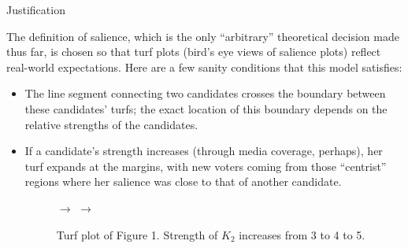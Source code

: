 \documentclass{article}
\begin{document}
\begin{section}{Justification}

The definition of salience, which is the only ``arbitrary'' theoretical decision made thus far, is chosen so that turf plots (bird's eye views of salience plots) reflect real-world expectations. Here are a few sanity conditions that this model satisfies:
\begin{itemize}
\item The line segment connecting two candidates crosses the boundary between these candidates' turfs; the exact location of this boundary depends on the relative strengths of the candidates.
\item If a candidate's strength increases (through media coverage, perhaps), her turf expands at the margins, with new voters coming from those ``centrist'' regions where her salience was close to that of another candidate.
\begin{figure}[!h]
\centering
{} $\rightarrow$
 $\rightarrow$
\caption{Turf plot of Figure 1. Strength of $K_2$ increases from 3 to 4 to 5.}
\end{figure}

\end{itemize}
\end{section}
\end{document}
